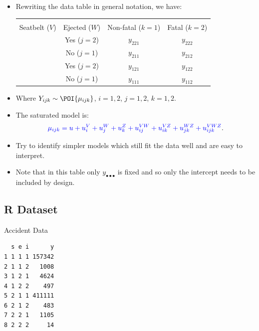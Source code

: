 \documentclass{article}\usepackage[]{graphicx}\usepackage[svgnames]{xcolor}
\makeatletter
\newenvironment{kframe}{%
 \def\at@end@of@kframe{}%
 \ifinner\ifhmode%
  \def\at@end@of@kframe{\end{minipage}}%
  \begin{minipage}{\columnwidth}%
 \fi\fi%
 \def\FrameCommand##1{\hskip\@totalleftmargin \hskip-\fboxsep
 \colorbox{shadecolor}{##1}\hskip-\fboxsep
     \hskip-\linewidth \hskip-\@totalleftmargin \hskip\columnwidth}%
 \MakeFramed {\advance\hsize-\width
   \@totalleftmargin\z@ \linewidth\hsize
   \@setminipage}}%
 {\par\unskip\endMakeFramed%
 \at@end@of@kframe}
\newenvironment{knitrout}{}{} %
\let\log\relax%
\makeatother
\begin{document}
\begin{itemize}
    \item Rewriting the data table in general notation, we have:
          \begin{table}[H]
              \centering
              \begin{NiceTabular}{cccc}
                  \toprule
                  &                 &            \\
                  Seatbelt ($ V $) & Ejected ($ W $) & Non-fatal ($ k=1 $) & Fatal ($ k=2 $)          \\
                  \midrule
                   & Yes  ($ j=2 $) & $ y_{221} $ & $ y_{222} $\\
                  & No  ($ j=1 $) & $ y_{211} $ & $ y_{212} $\\
                   & Yes ($ j=2 $) & $ y_{121} $ & $ y_{122} $\\
                  & No ($ j=1 $) & $ y_{111} $ & $ y_{112} $\\
                  \bottomrule
              \end{NiceTabular}
          \end{table}
    \item Where $ Y_{ijk}\sim \POI{\mu_{ijk}} $, $ i=1,2 $, $ j=1,2 $, $ k=1,2 $.
    \item The saturated model is:
          \[ \textcolor{Blue}{\log{\mu_{ijk}}=u+u_i^V+u_j^W+u_k^Z+u_{ij}^{VW}+u_{ik}^{VZ}+u_{jk}^{WZ}+u_{ijk}^{VWZ}}. \]
    \item Try to identify simpler models which still fit the data well and are easy to interpret.
    \item Note that in this table only $ y_{\bullet\bullet\bullet} $ is fixed and so only the intercept needs to be
          included by design.
\end{itemize}
\subsection*{R Dataset}
\begin{Example}{Accident Data}
\begin{knitrout}
\color{fgcolor}\begin{kframe}
\begin{verbatim}
  s e i      y
1 1 1 1 157342
2 1 1 2   1008
3 1 2 1   4624
4 1 2 2    497
5 2 1 1 411111
6 2 1 2    483
7 2 2 1   1105
8 2 2 2     14
\end{verbatim}
\end{kframe}
\end{knitrout}
\end{Example}
\end{document}
